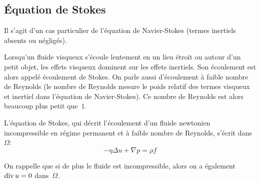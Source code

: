 \medskip
\subsection{Équation de Stokes}

Il s'agit d'un cas particulier de l'équation de Navier-Stokes (termes inertiels absents ou négligés).

Lorsqu'un fluide visqueux s'écoule lentement en un lieu étroit ou autour d'un petit objet, les effets visqueux dominent sur les effets inertiels. Son écoulement est alors appelé écoulement de Stokes. On parle aussi d'écoulement à faible nombre de Reynolds (le nombre de Reynolds mesure le poids relatif des termes visqueux et inertiel dans l'équation de Navier-Stokes). Ce nombre de Reynolds est alors beaucoup plus petit que~$1$.

\medskip
L'équation de Stokes, qui décrit l'écoulement d'un fluide newtonien incompressible en régime permanent et à faible nombre de Reynolds, s'écrit dans~$\Omega$:
\begin{equation}
-\eta \Delta u + \nabla p = \rho f
\end{equation}

On rappelle que si de plus le fluide est incompressible, alors on a également 
$\operatorname{div} u = 0$ dans~$\Omega$.


